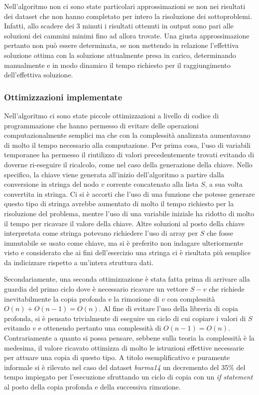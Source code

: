 Nell'algoritmo non ci sono state particolari approssimazioni se non nei risultati dei dataset che non hanno completato per intero la risoluzione dei sottoproblemi. Infatti, allo scadere dei 3 minuti i risultati ottenuti in output sono pari alle soluzioni dei cammini minimi fino ad allora trovate. Una giusta approssimazione pertanto non può essere determinata, se non mettendo in relazione l'effettiva soluzione ottima con la soluzione attualmente presa in carico, determinando manualmente e in modo dinamico il tempo richiesto per il raggiungimento dell'effettiva soluzione. 


\subsubsection{Ottimizzazioni implementate}

Nell'algoritmo ci sono state piccole ottimizzazioni a livello di codice di programmazione che hanno permesso di evitare delle operazioni computazionalmente semplici ma che con la complessità analizzata aumentavano di molto il tempo necessario alla computazione. Per prima cosa, l'uso di variabili temporanee ha permesso il riutilizzo di valori precedentemente trovati evitando di doverne ri-eseguire il ricalcolo, come nel caso della generazione della chiave. Nello specifico, la chiave viene generata all'inizio dell'algoritmo a partire dalla conversione in stringa del nodo \(v\) corrente concatenato alla lista \(S\), a sua volta convertita in stringa.
Ci si è accorti che l'uso di una funzione che potesse generare questo tipo di stringa avrebbe aumentato di molto il tempo richiesto per la risoluzione del problema, mentre l'uso di una variabile iniziale ha ridotto di molto il tempo per ricavare il valore della chiave.
Altre soluzioni al posto della chiave interpretata come stringa potevano richiedere l'uso di array per \(S\) che fosse immutabile se usato come chiave, ma si è preferito non indagare ulteriormente visto e considerato che ai fini dell'esercizio una stringa ci è risultata più semplice da indicizzare rispetto a un'intera struttura dati. 

Secondariamente, una seconda ottimizzazione è stata fatta prima di arrivare alla guardia del primo ciclo dove è necessario ricavare un vettore \(S - {v}\) che richiede inevitabilmente la copia profonda e la rimozione di \(v\) con complessità \(O(n) + O(n-1) = O(n)\). Al fine di evitare l'uso della libreria di copia profonda, si è pensato trivialmente di eseguire un ciclo di cui copiare i valori di \(S\) evitando \(v\) e ottenendo pertanto una complessità di \(O(n-1) = O(n)\). 
Contrariamente a quanto si possa pensare, sebbene sulla teoria la complessità è la medesima, il valore ricavato ottimizza di molto le istruzioni effettive necessarie per attuare una copia di questo tipo. A titolo esemplificativo e puramente informale si è rilevato nel caso del dataset \textit{burma14} un decremento del 35\% del tempo impiegato per l'esecuzione sfruttando un ciclo di copia con un \textit{if statement} al posto della copia profonda e della successiva rimozione. 


